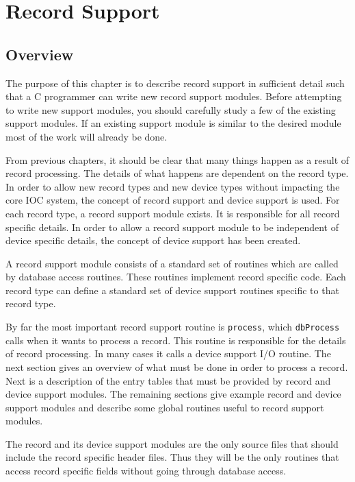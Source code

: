 \chapter{Record Support}

\section{Overview}

The purpose of this chapter is to describe record support in sufficient detail such that a C programmer can write new record support modules.
Before attempting to write new support modules, you should carefully study a few of the existing support modules.
If an existing support module is similar to the desired module most of the work will already be done.

From previous chapters, it should be clear that many things happen as a result of record processing.
The details of what happens are dependent on the record type.
In order to allow new record types and new device types without impacting the core IOC system, the concept of record support and device support is used.
For each record type, a record support module exists.
It is responsible for all record specific details.
In order to allow a record support module to be independent of device specific details, the concept of device support has been created.

A record support module consists of a standard set of routines which are called by database access routines.
These routines implement record specific code.
Each record type can define a standard set of device support routines specific to that record type.

By far the most important record support routine is \verb|process|, which \verb|dbProcess| calls when it wants to process a record.
This routine is responsible for the details of record processing.
In many cases it calls a device support I/O routine.
The next section gives an overview of what must be done in order to process a record.
Next is a description of the entry tables that must be provided by record and device support modules.
The remaining sections give example record and device support modules and describe some global routines useful to record support modules.

The record and its device support modules are the only source files that should include the record specific header files.
Thus they will be the only routines that access record specific fields without going through database access.

